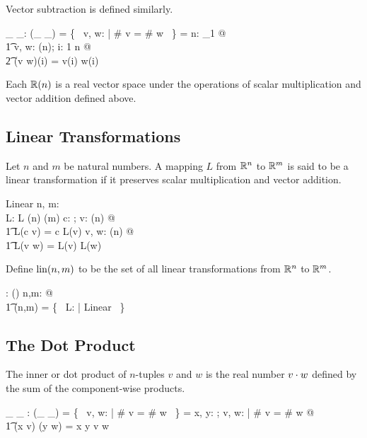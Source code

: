 \documentclass[11pt, oneside]{article}
\begin{document}
Vector subtraction is defined similarly.

\begin{axdef}
	\_ \vsubR \_: \Rinf \cross \Rinf \pfun \Rinf
\where
	\dom(\_ \vsubR \_) = \{~ v, w: \Rinf | \# v = \# w ~\}
\also
	\langle \rangle \vsubR \langle \rangle = \langle \rangle
\also
	\forall n: \nat_1 @ \\
	\t1	\forall v, w: \Rtuples(n); i: 1 \upto n @ \\
	\t2		(v \vsubR w)(i) = v(i) \subR w(i)
\end{axdef}

Each $\mathbb{R}(n)$ is a real vector space under the operations of scalar multiplication and vector addition
defined above. 

\subsection{Linear Transformations}

Let $n$ and $m$ be natural numbers.
A mapping $L$ from $\mathbb{R}^n$ to $\mathbb{R}^m$ is said to be a linear transformation if it preserves scalar multiplication and vector addition.
\begin{schema}{Linear}
	n, m: \nat \\
	L: \Rinf \pfun \Rinf
\where
	L \in \Rtuples(n) \fun \Rtuples(m)
\also
	\forall c: \R; v: \Rtuples(n) @ \\
	\t1	L(c \smulR v) = c \smulR L(v)
\also
	\forall v, w: \Rtuples(n) @ \\
	\t1	L(v \vaddR w) = L(v) \vaddR L(w)
\end{schema}

Define $\operatorname{lin}(n,m)$ to be the set of all linear transformations from $\mathbb{R}^n$ to $\mathbb{R}^m$.
\begin{axdef}
	\linR: \nat \cross \nat \fun \power(\Rinf \pfun \Rinf)
\where
	\forall n,m: \nat @ \\
	\t1	\linR(n,m) = \{~ L: \Rinf \pfun \Rinf | Linear ~\}
\end{axdef}

\subsection{The Dot Product}

The inner or dot product of $n$-tuples $v$ and $w$ is the real number $v \mathbin{\cdot} w$ defined by the sum of the component-wise products.

\begin{axdef}
	\_ \dotR \_ : \Rinf \cross \Rinf \pfun \R
\where
	\dom(\_ \dotR \_) = \{~ v, w: \Rinf | \# v = \# w ~\}
\also
	\langle \rangle \dotR \langle \rangle = \zeroR
\also
	\forall x, y: \R; v, w: \Rinf | \# v = \# w @ \\
	\t1	(\langle x \rangle \cat v) \dotR (\langle y \rangle \cat w) = x \mulR y \addR v \dotR w
\end{axdef}
\end{document}
